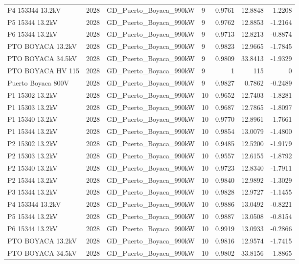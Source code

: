\documentclass[11pt,a4paper]{article}
\begin{document}
\begin{longtable}{llllrrr}
P4 153344 13.2kV & 2028 & GD\_Puerto\_Boyaca\_990kW & 9 & 0.9761 & 12.8848 & -1.2208 \\
P5 15344 13.2kV & 2028 & GD\_Puerto\_Boyaca\_990kW & 9 & 0.9762 & 12.8853 & -1.2164 \\
P6 15344 13.2kV & 2028 & GD\_Puerto\_Boyaca\_990kW & 9 & 0.9713 & 12.8213 & -0.8874 \\
PTO BOYACA 13.2kV & 2028 & GD\_Puerto\_Boyaca\_990kW & 9 & 0.9823 & 12.9665 & -1.7845 \\
PTO BOYACA 34.5kV & 2028 & GD\_Puerto\_Boyaca\_990kW & 9 & 0.9809 & 33.8413 & -1.9329 \\
PTO BOYACA HV 115 & 2028 & GD\_Puerto\_Boyaca\_990kW & 9 & 1 & 115 & 0 \\
Puerto Boyaca 800V & 2028 & GD\_Puerto\_Boyaca\_990kW & 9 & 0.9827 & 0.7862 & -0.2489 \\
P1 15302 13.2kV & 2028 & GD\_Puerto\_Boyaca\_990kW & 10 & 0.9652 & 12.7403 & -1.8281 \\
P1 15303 13.2kV & 2028 & GD\_Puerto\_Boyaca\_990kW & 10 & 0.9687 & 12.7865 & -1.8097 \\
P1 15340 13.2kV & 2028 & GD\_Puerto\_Boyaca\_990kW & 10 & 0.9770 & 12.8961 & -1.7661 \\
P1 15344 13.2kV & 2028 & GD\_Puerto\_Boyaca\_990kW & 10 & 0.9854 & 13.0079 & -1.4800 \\
P2 15302 13.2kV & 2028 & GD\_Puerto\_Boyaca\_990kW & 10 & 0.9485 & 12.5200 & -1.9179 \\
P2 15303 13.2kV & 2028 & GD\_Puerto\_Boyaca\_990kW & 10 & 0.9557 & 12.6155 & -1.8792 \\
P2 15340 13.2kV & 2028 & GD\_Puerto\_Boyaca\_990kW & 10 & 0.9723 & 12.8340 & -1.7911 \\
P2 15344 13.2kV & 2028 & GD\_Puerto\_Boyaca\_990kW & 10 & 0.9840 & 12.9892 & -1.3029 \\
P3 15344 13.2kV & 2028 & GD\_Puerto\_Boyaca\_990kW & 10 & 0.9828 & 12.9727 & -1.1455 \\
P4 153344 13.2kV & 2028 & GD\_Puerto\_Boyaca\_990kW & 10 & 0.9886 & 13.0492 & -0.8221 \\
P5 15344 13.2kV & 2028 & GD\_Puerto\_Boyaca\_990kW & 10 & 0.9887 & 13.0508 & -0.8154 \\
P6 15344 13.2kV & 2028 & GD\_Puerto\_Boyaca\_990kW & 10 & 0.9919 & 13.0933 & -0.2866 \\
PTO BOYACA 13.2kV & 2028 & GD\_Puerto\_Boyaca\_990kW & 10 & 0.9816 & 12.9574 & -1.7415 \\
PTO BOYACA 34.5kV & 2028 & GD\_Puerto\_Boyaca\_990kW & 10 & 0.9802 & 33.8156 & -1.8865 \\

\end{longtable}
\end{document}
